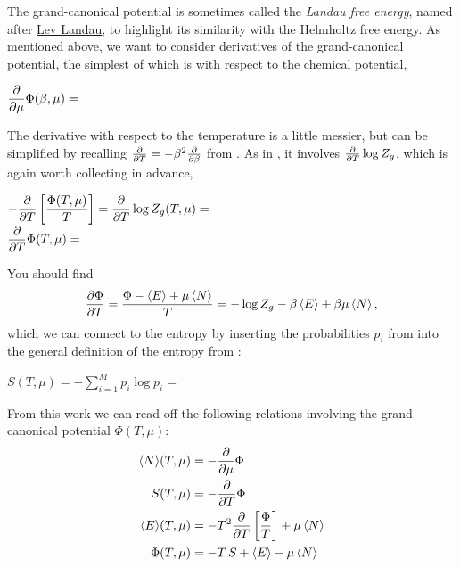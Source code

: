 The grand-canonical potential is sometimes called the \textit{Landau free energy}, named after \href{https://en.wikipedia.org/wiki/Lev_Landau}{Lev Landau}, to highlight its similarity with the Helmholtz free energy.
As mentioned above, we want to consider derivatives of the grand-canonical potential, the simplest of which is with respect to the chemical potential,
\begin{mdframed}
  $\displaystyle \frac{\partial }{\partial \mu} \Phi(\beta, \mu) = $ \\[120 pt]
\end{mdframed}
The derivative with respect to the temperature is a little messier, but can be simplified by recalling $\frac{\partial }{\partial T} = -\beta^2 \frac{\partial }{\partial \beta}$ from .
As in , it involves $\frac{\partial }{\partial T} \log Z_g$, which is again worth collecting in advance,
\begin{mdframed}
  $\displaystyle -\frac{\partial }{\partial T}\left[\frac{\Phi(T, \mu)}{T}\right] = \frac{\partial }{\partial T} \log Z_g(T, \mu) = $ \\[100 pt]
  $\displaystyle \frac{\partial }{\partial T} \Phi(T, \mu) = $ \\[80 pt]
\end{mdframed}
You should find
\begin{equation*}
  \frac{\partial \Phi}{\partial T} = \frac{\Phi - \left\langle E \right\rangle + \mu\left\langle N \right\rangle}{T} = -\log Z_g - \beta\left\langle E \right\rangle + \beta\mu\left\langle N \right\rangle,
\end{equation*}
\newpage %
\noindent which we can connect to the entropy by inserting the probabilities $p_i$ from  into the general definition of the entropy from :
\begin{mdframed}
  $\displaystyle S(T, \mu) = -\sum_{i = 1}^M p_i \log p_i = $ \\[100 pt]
\end{mdframed}

\begin{shaded}
  From this work we can read off the following relations involving the grand-canonical potential $\Phi(T, \mu)$:
  \begin{align}
    \left\langle N \right\rangle\!(T, \mu) & = -\frac{\partial }{\partial \mu} \Phi \label{eq:N_grand} \\
            S(T, \mu) & = -\frac{\partial }{\partial T} \Phi \\
    \left\langle E \right\rangle\!(T, \mu) & = -T^2 \frac{\partial }{\partial T} \left[\frac{\Phi}{T}\right] + \mu \left\langle N \right\rangle \label{eq:E_grand} \\
         \Phi(T, \mu) & = -T \, S + \left\langle E \right\rangle - \mu \left\langle N \right\rangle \label{eq:grand_relation}
  \end{align}
\end{shaded}

